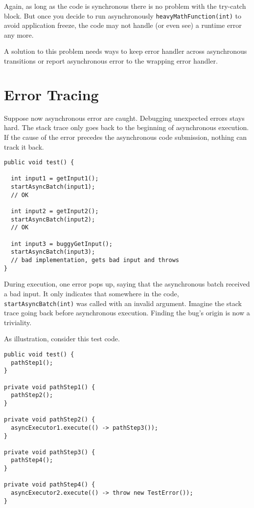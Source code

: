 Again, as long as the code is synchronous there is no problem with the try-catch block. But once you decide to run asynchronously \lstinline{heavyMathFunction(int)} to avoid application freeze, the code may not handle (or even see) a runtime error any more.

A solution to this problem needs ways to keep error handler across asynchronous transitions or report asynchronous error to the wrapping error handler.

\section{Error Tracing}

Suppose now asynchronous error are caught. Debugging unexpected errors stays hard. The stack trace only goes back to the beginning of asynchronous execution. If the cause of the error precedes the asynchronous code submission, nothing can track it back.

\begin{lstlisting}
public void test() {

  int input1 = getInput1();
  startAsyncBatch(input1);
  // OK

  int input2 = getInput2();
  startAsyncBatch(input2);
  // OK

  int input3 = buggyGetInput();
  startAsyncBatch(input3);
  // bad implementation, gets bad input and throws
}
\end{lstlisting}

During execution, one error pops up, saying that the asynchronous batch received a bad input. It only indicates that somewhere in the code, \lstinline{startAsyncBatch(int)} was called with an invalid argument. Imagine the stack trace going back before asynchronous execution. Finding the bug's origin is now a triviality. 

As illustration, consider this test code.

\begin{lstlisting}
public void test() {
  pathStep1();
}

private void pathStep1() {
  pathStep2();
}

private void pathStep2() {
  asyncExecutor1.execute(() -> pathStep3());
}

private void pathStep3() {
  pathStep4();
}

private void pathStep4() {
  asyncExecutor2.execute(() -> throw new TestError());
}
\end{lstlisting}

